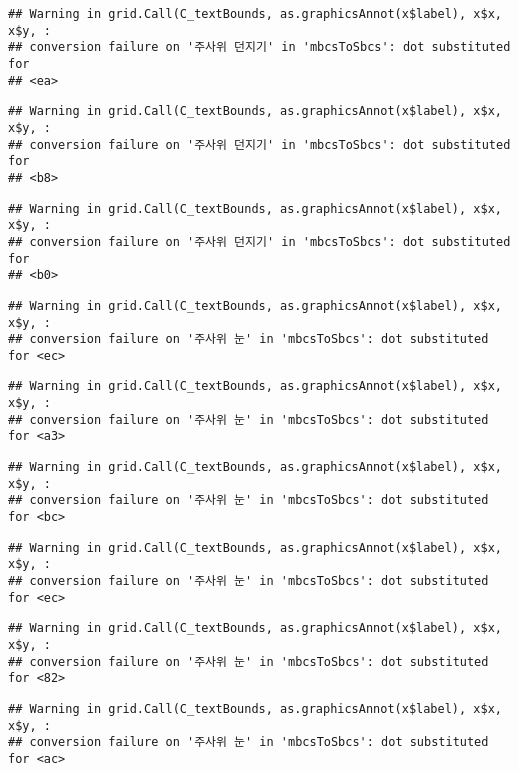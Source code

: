 \documentclass[]{book}
\begin{document}
\begin{verbatim}
## Warning in grid.Call(C_textBounds, as.graphicsAnnot(x$label), x$x, x$y, :
## conversion failure on '주사위 던지기' in 'mbcsToSbcs': dot substituted for
## <ea>
\end{verbatim}

\begin{verbatim}
## Warning in grid.Call(C_textBounds, as.graphicsAnnot(x$label), x$x, x$y, :
## conversion failure on '주사위 던지기' in 'mbcsToSbcs': dot substituted for
## <b8>
\end{verbatim}

\begin{verbatim}
## Warning in grid.Call(C_textBounds, as.graphicsAnnot(x$label), x$x, x$y, :
## conversion failure on '주사위 던지기' in 'mbcsToSbcs': dot substituted for
## <b0>
\end{verbatim}

\begin{verbatim}
## Warning in grid.Call(C_textBounds, as.graphicsAnnot(x$label), x$x, x$y, :
## conversion failure on '주사위 눈' in 'mbcsToSbcs': dot substituted for <ec>
\end{verbatim}

\begin{verbatim}
## Warning in grid.Call(C_textBounds, as.graphicsAnnot(x$label), x$x, x$y, :
## conversion failure on '주사위 눈' in 'mbcsToSbcs': dot substituted for <a3>
\end{verbatim}

\begin{verbatim}
## Warning in grid.Call(C_textBounds, as.graphicsAnnot(x$label), x$x, x$y, :
## conversion failure on '주사위 눈' in 'mbcsToSbcs': dot substituted for <bc>
\end{verbatim}

\begin{verbatim}
## Warning in grid.Call(C_textBounds, as.graphicsAnnot(x$label), x$x, x$y, :
## conversion failure on '주사위 눈' in 'mbcsToSbcs': dot substituted for <ec>
\end{verbatim}

\begin{verbatim}
## Warning in grid.Call(C_textBounds, as.graphicsAnnot(x$label), x$x, x$y, :
## conversion failure on '주사위 눈' in 'mbcsToSbcs': dot substituted for <82>
\end{verbatim}

\begin{verbatim}
## Warning in grid.Call(C_textBounds, as.graphicsAnnot(x$label), x$x, x$y, :
## conversion failure on '주사위 눈' in 'mbcsToSbcs': dot substituted for <ac>
\end{verbatim}
\end{document}
